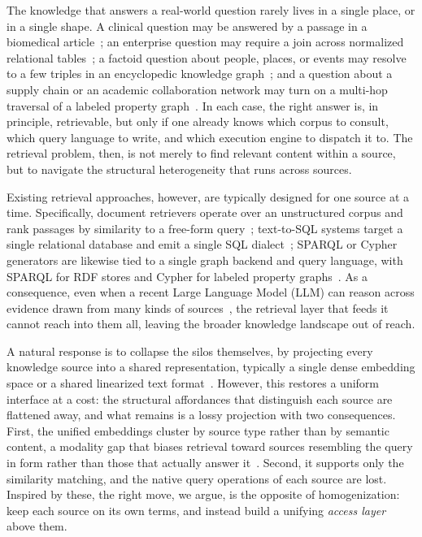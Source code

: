 \documentclass{llmxive}
\begin{document}
The knowledge that answers a real-world question rarely lives in a single place, or in a single shape. A clinical question may be answered by a passage in a biomedical article~\citep{BEIR}; an enterprise question may require a join across normalized relational tables~\citep{Spider, Bird}; a factoid question about people, places, or events may resolve to a few triples in an encyclopedic knowledge graph~\citep{Freebase, Wikidata}; and a question about a supply chain or an academic collaboration network may turn on a multi-hop traversal of a labeled property graph~\citep{Text2Cypher}. In each case, the right answer is, in principle, retrievable, but only if one already knows which corpus to consult, which query language to write, and which execution engine to dispatch it to. The retrieval problem, then, is not merely to find relevant content within a source, but to navigate the structural heterogeneity that runs across sources.

Existing retrieval approaches, however, are typically designed for one source at a time. Specifically, document retrievers operate over an unstructured corpus and rank passages by similarity to a free-form query~\citep{BM25, DPR}; text-to-SQL systems target a single relational database and emit a single SQL dialect~\citep{Spider, Bird}; SPARQL or Cypher generators are likewise tied to a single graph backend and query language, with SPARQL for RDF stores and Cypher for labeled property graphs~\citep{Text2SPARQL, Text2Cypher}. As a consequence, even when a recent Large Language Model (LLM) can reason across evidence drawn from many kinds of sources~\citep{Claude3, Gemini-2.5, GPT-5}, the retrieval layer that feeds it cannot reach into them all, leaving the broader knowledge landscape out of reach.

A natural response is to collapse the silos themselves, by projecting every knowledge source into a shared representation, typically a single dense embedding space or a shared linearized text format~\citep{UniK, UDT, DiFaR}. However, this restores a uniform interface at a cost: the structural affordances that distinguish each source are flattened away, and what remains is a lossy projection with two consequences. First, the unified embeddings cluster by source type rather than by semantic content, a modality gap that biases retrieval toward sources resembling the query in form rather than those that actually answer it~\citep{UniversalRAG}. Second, it supports only the similarity matching, and the native query operations of each source are lost. Inspired by these, the right move, we argue, is the opposite of homogenization: keep each source on its own terms, and instead build a unifying \emph{access layer} above them.
\end{document}
